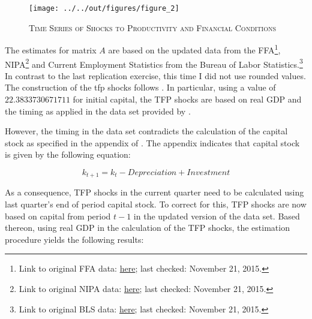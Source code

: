 \begin{figure}
    
    \centering

    \texttt{[image: ../../out/figures/figure\_2]}

    \caption{\textsc{Time Series of Shocks to Productivity and Financial Conditions}}
    
    \label{fig:figure_2}

\end{figure}



The estimates for matrix $A$ are based on the updated data from the FFA\footnote{Link to original FFA data: \href{http://www.federalreserve.gov/datadownload/Download.aspx?rel=Z1&series=0158dbd07710fd0793be0d27731bac4c&filetype=spreadsheetml&label=include&layout=seriescolumn&from=03/01/1952&to=12/31/2015}{here}; last checked: November 21, 2015.},
NIPA\footnote{Link to original NIPA data: \href{http://www.bea.gov//national/nipaweb/DownSS2.asp}{here}; last checked: November 21, 2015.} 
and Current Employment Statistics from the Bureau of Labor Statistics.\footnote{Link to original BLS data: \href{https://research.stlouisfed.org/fred2/series/AWHI/downloaddata}{here}; last checked: November 21, 2015.} 
In contrast to the last replication exercise, this time I did not use rounded values. The construction of the tfp shocks follows \citet{JERMANNfinancial}. In particular, using a value of $22.3833730671711$ for initial capital, the TFP shocks are based on real GDP and the timing as applied in the data set provided by \citeauthor{JERMANNfinancial}.

However, the timing in the data set contradicts the calculation of the capital stock as specified in the appendix of \citeauthor{JERMANNfinancial}. The appendix indicates that capital stock is given by the following equation:

\begin{equation} \label{eq:capital_stock}
k_{t+1} = k_{t} - Depreciation + Investment
\end{equation} 

As a consequence, TFP shocks in the current quarter need to be calculated using last quarter's end of period capital stock. To correct for this, TFP shocks are now based on capital from period $t-1$ in the updated version of the data set. Based thereon, using real GDP in the calculation of the TFP shocks, the estimation procedure yields the following results:


